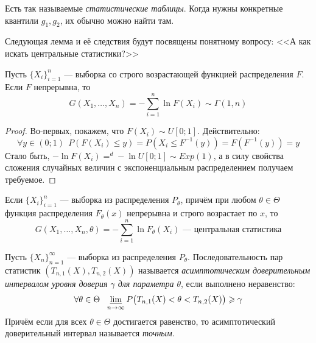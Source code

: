 \begin{note}
	Есть так называемые \textit{статистические таблицы}. Когда нужны конкретные квантили $g_1, g_2$, их обычно можно найти там.
\end{note}

\begin{note}
	Следующая лемма и её следствия будут посвящены понятному вопросу: <<А как искать центральные статистики?>>
\end{note}

\begin{lemma}
	Пусть $\{X_i\}_{i = 1}^n$ --- выборка со строго возрастающей функцией распределения $F$. Если $F$ непрерывна, то
	\[
		G(X_1, \ldots, X_n) = -\sum_{i = 1}^n \ln F(X_i) \sim \Gamma(1, n)
	\]
\end{lemma}

\begin{proof}
	Во-первых, покажем, что $F(X_i) \sim U[0; 1]$. Действительно:
	\[
		\forall y \in (0; 1)\ \ P(F(X_i) \le y) = P(X_i \le F^{-1}(y)) = F(F^{-1}(y)) = y
	\]
	Стало быть, $-\ln F(X_i) =^d -\ln U[0; 1] \sim Exp(1)$, а в силу свойства сложения случайных величин с экспоненциальным распределением получаем требуемое.
\end{proof}

\begin{corollary}
	Если $\{X_i\}_{i = 1}^n$ --- выборка из распределения $P_\theta$, причём при любом $\theta \in \Theta$ функция распределения $F_\theta(x)$ непрерывна и строго возрастает по $x$, то
	\[
		G(X_1, \ldots, X_n, \theta) = -\sum_{i = 1}^n \ln F_\theta(X_i) \text{ --- центральная статистика}
	\]
\end{corollary}

\begin{definition}
	Пусть $\{X_n\}_{n = 1}^\infty$ --- выборка из распределения $P_\theta$. Последовательность пар статистик $(T_{n, 1}(X), T_{n, 2}(X))$ называется \textit{асимптотическим доверительным интервалом уровня доверия $\gamma$ для параметра $\theta$}, если выполнено неравенство:
	\[
		\forall \theta \in \Theta\ \ \varliminf_{n \to \infty} P\big(T_{n, 1}(X) < \theta < T_{n, 2}(X)\big) \ge \gamma
	\]
	Причём если для всех $\theta \in \Theta$ достигается равенство, то асимптотический доверительный интервал называется \textit{точным}.
\end{definition}

